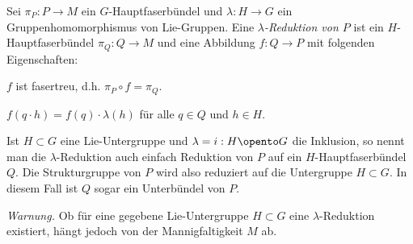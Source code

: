 \documentclass[%
	paper=a5,%
	fleqn,%
	DIV=18,%
	BCOR=0mm,
	fontsize=11pt,
	titlepage=false,%
	bibliography=totoc,
	DIV=18,%
	twoside=true,
	pdftitle=Riemannsche Geometrie,
	pdfauthor=Uwe Semmelmann,
	numbers=noendperiod]%
	{scrbook}
\begin{document}
\begin{defn}
Sei $\pi_P\colon P\to M$ ein $G$-Hauptfaserbündel und $\lambda\colon H\to G$ ein
Gruppenhomomorphismus von Lie-Gruppen. Eine \emph{$\lambda$-Reduktion von $P$}
ist ein $H$-Hauptfaserbündel $\pi_Q\colon Q\to M$ und eine Abbildung $f\colon Q\to P$ mit
folgenden Eigenschaften:
\begin{defnenum}
  \item $f$ ist fasertreu, d.h. $\pi_P\circ f = \pi_Q$.
  \item $f(q\cdot h) = f(q)\cdot \lambda(h)$ für alle $q\in Q$ und $h\in
  H$.
\end{defnenum}

\centering
{}\fish
\end{defn}

\begin{rem}[Bemerkungen.]
\begin{remenum}
\item
Ist $H\subset G$ eine Lie-Untergruppe und $\lambda = i: H\opento G$ die
Inklusion, so nennt man die $\lambda$-Reduktion auch einfach Reduktion von
$P$ auf ein $H$-Hauptfaserbündel $Q$.
Die Strukturgruppe von $P$ wird also reduziert auf die Untergruppe $H\subset
G$. In diesem Fall ist $Q$ sogar ein Unterbündel von $P$.
\item \textit{Warnung.} Ob für eine gegebene Lie-Untergruppe $H\subset G$ eine $\lambda$-Reduktion existiert, hängt jedoch von der Mannigfaltigkeit $M$ ab.\map
\end{remenum}
\end{rem}

\end{document}
